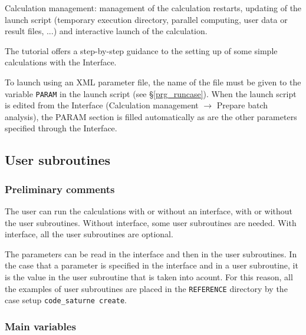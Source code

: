 {{{\begin{list}{-}{}
\item Calculation management: management of the calculation restarts,
      updating of the launch script (temporary execution directory, parallel
      computing, user data or result files, ...) and interactive launch of the
      calculation.

\end{list}

The \CS tutorial \cite{tutorial} offers a step-by-step guidance to the setting
up of some simple calculations with the \CS Interface.

To launch \CS using an XML parameter file,
the name of the file must
be given to the variable \texttt{PARAM} in the launch script (see
\S\ref{prg_runcase}). When the launch
script is edited from the Interface (Calculation management $\rightarrow$
Prepare batch analysis), the PARAM section is filled automatically as are the
other parameters specified through the Interface.

\subsection{User subroutines}
\label{prg_ssprgutilis}
\subsubsection{Preliminary comments}

The user can run the calculations with or without an interface, with or
 without the user subroutines. Without interface, some user subroutines
 are needed. With interface, all the user subroutines are optional.

The parameters can be read in the interface and then in the user
subroutines. In the case that a parameter is specified in the interface
 and in a user subroutine, it is the value in the user subroutine that
 is taken into acount. For this reason, all the examples of
 user subroutines are placed in the \texttt{REFERENCE} directory by the
 case setup \texttt{code\_saturne~create}.

\subsubsection{Main variables}

}}}
